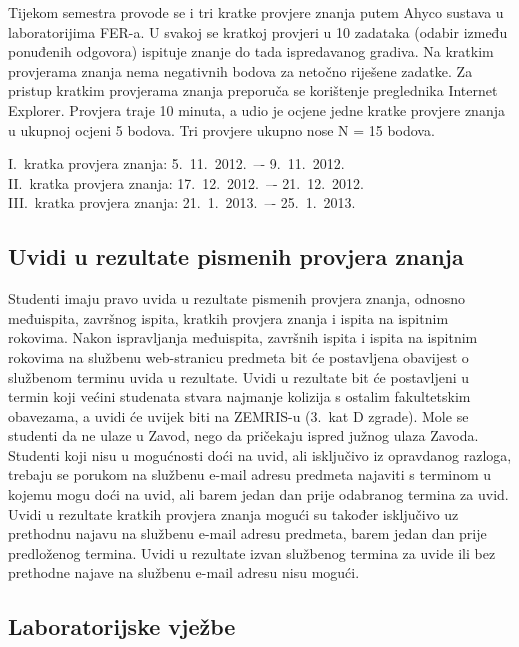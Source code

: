 \documentclass[times, 12pt, utf8]{book}
\begin{document}
Tijekom semestra provode se i tri kratke provjere znanja putem Ahyco sustava u laboratorijima FER-a.
U svakoj se kratkoj provjeri u 10 zadataka (odabir između ponuđenih odgovora) ispituje znanje do tada ispredavanog gradiva.
Na kratkim provjerama znanja nema negativnih bodova za netočno riješene zadatke.
Za pristup kratkim provjerama znanja preporuča se korištenje preglednika Internet Explorer.
Provjera traje 10 minuta, a udio je ocjene jedne kratke provjere znanja u ukupnoj ocjeni 5 bodova.
Tri provjere ukupno nose N = 15 bodova.


I.~kratka provjera znanja: 5.~11.~2012.~–- 9.~11.~2012. \\
II.~kratka provjera znanja: 17.~12.~2012.~–- 21.~12.~2012. \\
III.~kratka provjera znanja: 21.~1.~2013.~–- 25.~1.~2013.


\cleardoublepage  
{}  
{}
\subsection*{Uvidi u rezultate pismenih provjera znanja}

Studenti imaju pravo uvida u rezultate pismenih provjera znanja, odnosno međuispita, završnog ispita, kratkih provjera znanja i ispita na ispitnim rokovima.
Nakon ispravljanja međuispita, završnih ispita i ispita na ispitnim rokovima na službenu web-stranicu predmeta bit će postavljena obavijest o službenom terminu uvida u rezultate.
Uvidi u rezultate bit će postavljeni u termin koji većini studenata stvara najmanje kolizija s ostalim fakultetskim obavezama, a uvidi će uvijek biti na ZEMRIS-u (3.~kat D zgrade).
Mole se studenti da ne ulaze u Zavod, nego da pričekaju ispred južnog ulaza Zavoda.
Studenti koji nisu u mogućnosti doći na uvid, ali isključivo iz opravdanog razloga, trebaju se porukom na službenu e-mail adresu predmeta najaviti s terminom u kojemu mogu doći na uvid, ali barem jedan dan prije odabranog termina za uvid.
Uvidi u rezultate kratkih provjera znanja mogući su također isključivo uz prethodnu najavu na službenu e-mail adresu predmeta, barem jedan dan prije predloženog termina.
Uvidi u rezultate izvan službenog termina za uvide ili bez prethodne najave na službenu e-mail adresu nisu mogući.

\cleardoublepage  
{}  
{}
\subsection*{Laboratorijske vježbe}
\end{document}
